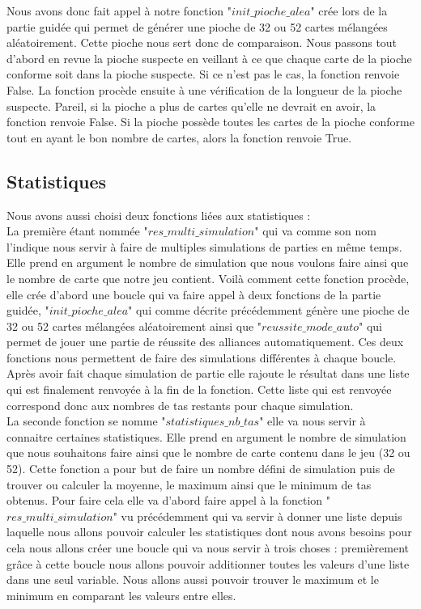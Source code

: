 \documentclass[10pt,a4paper,french,titlepage]{article}
\theoremstyle{definition}
\begin{document}
Nous avons donc fait appel à notre fonction "$init\_pioche\_alea$" crée lors de la partie guidée qui permet de générer une pioche de 32 ou 52 cartes mélangées aléatoirement\label{piochealea}. Cette pioche nous sert donc de comparaison. Nous passons tout d'abord en revue la pioche suspecte en veillant à ce que chaque carte de la pioche conforme soit dans la pioche suspecte. Si ce n'est pas le cas, la fonction renvoie False. La fonction procède ensuite à une vérification de la longueur de la pioche suspecte. Pareil, si la pioche a plus de cartes qu'elle ne devrait en avoir, la fonction renvoie False. Si la pioche possède toutes les cartes de la pioche conforme tout en ayant le bon nombre de cartes, alors la fonction renvoie True.

\subsection{Statistiques}
Nous avons aussi choisi deux fonctions liées aux statistiques : \\
La première étant nommée "$res\_multi\_simulation$" qui va comme son nom l'indique nous servir à faire de multiples simulations de parties en même temps. Elle prend en argument le nombre de simulation que nous voulons faire ainsi que le nombre de carte que notre jeu contient. Voilà comment cette fonction procède, elle crée d'abord une boucle qui va faire appel à deux fonctions de la partie guidée, "$init\_pioche\_alea$" qui comme décrite précédemment génère une pioche de 32 ou 52 cartes mélangées aléatoirement ainsi que "$reussite\_mode\_auto$" qui permet de jouer une partie de réussite des alliances automatiquement. Ces deux fonctions nous permettent de faire des simulations différentes à chaque boucle. Après avoir fait chaque simulation de partie elle rajoute le résultat dans une liste qui est finalement renvoyée à la fin de la fonction. Cette liste qui est renvoyée correspond donc aux nombres de tas restants pour chaque simulation.\\

La seconde fonction se nomme "$statistiques\_nb\_tas$" elle va nous servir à connaitre certaines statistiques. Elle prend en argument le nombre de simulation que nous souhaitons faire ainsi que le nombre de carte contenu dans le jeu (32 ou 52). Cette fonction a pour but de faire un nombre défini de simulation puis de trouver ou calculer la moyenne, le maximum ainsi que le minimum de tas obtenus. Pour faire cela elle va d'abord faire appel à la fonction "$res\_multi\_simulation$" vu précédemment qui va servir à donner une liste depuis laquelle nous allons pouvoir calculer les statistiques dont nous avons besoins pour cela nous allons créer une boucle qui va nous servir à trois choses : premièrement grâce à cette boucle nous allons pouvoir additionner toutes les valeurs d'une liste dans une seul variable. Nous allons aussi pouvoir trouver le maximum et le minimum en comparant les valeurs entre elles.
\end{document}
